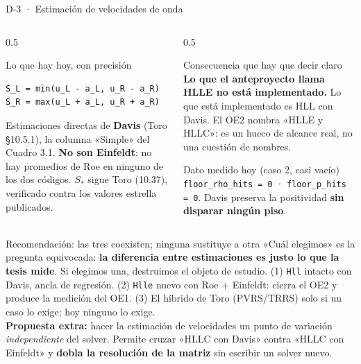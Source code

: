 \documentclass[aspectratio=169,10pt]{beamer}
\newcommand{\cod}[1]{\texttt{\small #1}}
\begin{document}
\begin{frame}[fragile]{D-3 · Estimación de velocidades de onda}

  \begin{columns}[t]
    \begin{column}{0.5\textwidth}
      \begin{block}{Lo que hay hoy, con precisión}
        \scriptsize
\begin{lstlisting}
S_L = min(u_L - a_L, u_R - a_R)
S_R = max(u_L + a_L, u_R + a_R)
\end{lstlisting}
        Estimaciones directas de \textbf{Davis} (Toro §10.5.1), la columna
        «Simple» del Cuadro 3.1. \textbf{No son Einfeldt}: no hay promedios de Roe
        en ninguno de los dos códigos. $S_*$ sigue Toro (10.37), verificado contra
        los valores estrella publicados.
      \end{block}
    \end{column}
    \begin{column}{0.5\textwidth}
      \begin{alertblock}{Consecuencia que hay que decir claro}
        \scriptsize
        \textbf{Lo que el anteproyecto llama HLLE no está implementado.} Lo que
        está implementado es HLL con Davis. El OE2 nombra «HLLE y HLLC»: es un
        hueco de alcance real, no una cuestión de nombres.
      \end{alertblock}
      \begin{exampleblock}{Dato medido hoy (caso 2, casi vacío)}
        \scriptsize
        \cod{floor\_rho\_hits = 0} · \cod{floor\_p\_hits = 0}.
        Davis preserva la positividad \textbf{sin disparar ningún piso}.
      \end{exampleblock}
    \end{column}
  \end{columns}

  \begin{exampleblock}{Recomendación: las tres coexisten; ninguna sustituye a otra}
    \scriptsize
    «Cuál elegimos» es la pregunta equivocada: \textbf{la diferencia entre
    estimaciones es justo lo que la tesis mide}. Si elegimos una, destruimos el
    objeto de estudio. (1) \cod{Hll} intacto con Davis, ancla de regresión.
    (2) \cod{Hlle} nuevo con Roe + Einfeldt: cierra el OE2 y produce la medición
    del OE1. (3) El híbrido de Toro (PVRS/TRRS) solo si un caso lo exige; hoy
    ninguno lo exige.
    \\[2pt]
    \textbf{Propuesta extra:} hacer la estimación de velocidades un punto de
    variación \emph{independiente} del solver. Permite cruzar «HLLC con Davis»
    contra «HLLC con Einfeldt» y \textbf{dobla la resolución de la matriz} sin
    escribir un solver nuevo.
  \end{exampleblock}
\end{frame}
\end{document}
